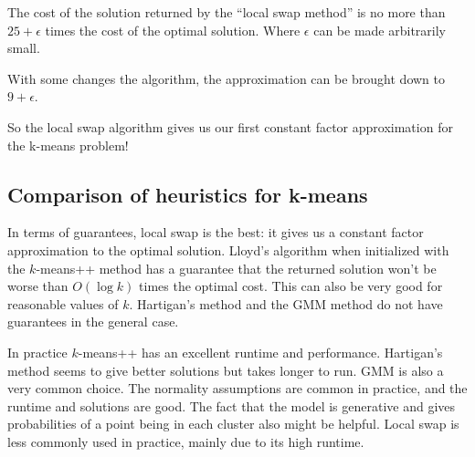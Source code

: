 \begin{theorem}
  The cost of the solution returned by the ``local swap method'' is no more than $25+\epsilon$ times the cost of the optimal solution.
  Where $\epsilon$ can be made arbitrarily small.
\end{theorem}
\begin{fact}
  With some changes the algorithm, the approximation can be brought down to $9+ \epsilon$.
\end{fact}

So the local swap algorithm gives us our first constant factor approximation for the k-means problem!

\subsection{Comparison of heuristics for k-means}
In terms of guarantees, local swap is the best: it gives us a constant factor approximation to the optimal solution. 
Lloyd's algorithm when initialized with the $k$-means++ method has a guarantee that the returned solution won't be worse than $O(\log k)$ times the optimal cost.
This can also be very good for reasonable values of $k$. Hartigan's method and the GMM method do not have guarantees in the general case.

In practice $k$-means++ has an excellent runtime and performance. Hartigan's method seems to give better solutions but takes longer to run. 
GMM is also a very common  choice. The normality assumptions are common in practice, and the runtime and solutions are good. The fact that the model is generative 
and gives probabilities of a point being in each cluster also might be helpful. Local swap is less commonly used in practice, 
mainly due to its high runtime.
	
